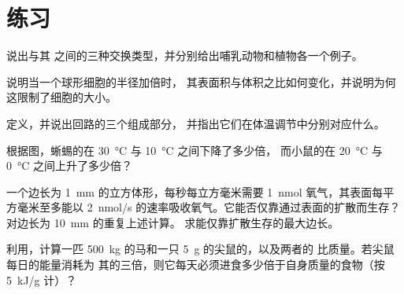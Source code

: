 \section{练习}

\begin{exercise}[$\star$]\label{exo:b1:organism-environment:1}
说出与其
之间的三种交换类型，并分别给出哺乳动物和植物各一个例子。
\end{exercise}

\begin{exercise}[$\star$]\label{exo:b1:organism-environment:2}
说明当一个球形细胞的半径加倍时，
其表面积与体积之比如何变化，并说明为何这限制了细胞的大小。
\end{exercise}

\begin{exercise}[$\star$]\label{exo:b1:organism-environment:3}
定义，并说出回路的三个组成部分，
并指出它们在体温调节中分别对应什么。
\end{exercise}

\begin{exercise}[$\star$]\label{exo:b1:organism-environment:4}
根据图，蜥蜴的在
\qty{30}{\celsius} 与 \qty{10}{\celsius} 之间下降了多少倍，
而小鼠的在 \qty{20}{\celsius} 与
\qty{0}{\celsius} 之间上升了多少倍？
\end{exercise}

\begin{exercise}[$\star\star$]\label{exo:b1:organism-environment:5}
一个边长为 \qty{1}{mm} 的立方体形，每秒每立方毫米需要
\qty{1}{nmol} 氧气，其表面每平方毫米至多能以
\qty{2}{nmol/s} 的速率吸收氧气。它能否仅靠通过表面的扩散而生存？
对边长为 \qty{10}{mm} 的重复上述计算。
求能仅靠扩散生存的最大边长。
\end{exercise}

\begin{exercise}[$\star\star$]\label{exo:b1:organism-environment:6}
利用，计算一匹
\qty{500}{kg} 的马和一只 \qty{5}{g} 的尖鼠的，以及两者的
比质量。若尖鼠每日的能量消耗为
其的三倍，则它每天必须进食多少倍于自身质量的食物（按
\qty{5}{kJ/g} 计）？
\end{exercise}

